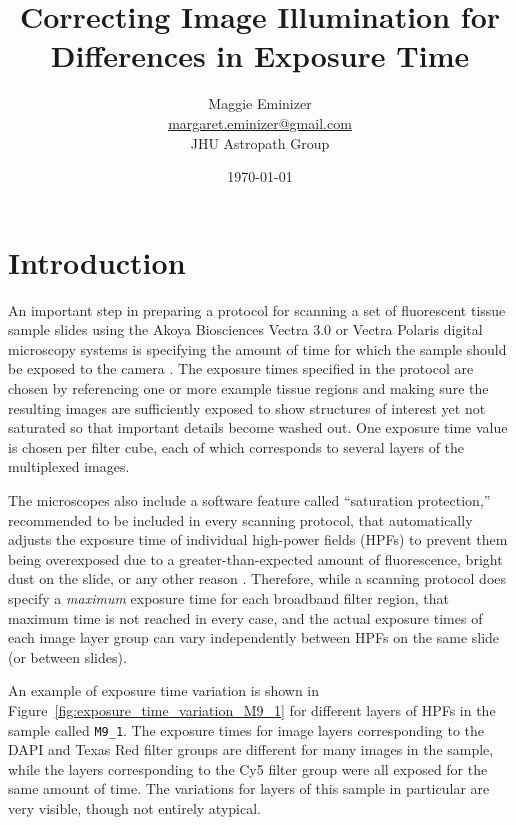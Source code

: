 \documentclass[letterpaper,11pt]{article}
\title{Correcting Image Illumination for Differences in Exposure Time}
\author{Maggie Eminizer\\ \url{margaret.eminizer@gmail.com}\\ JHU Astropath Group}
\date{\today}
\newcommand{\reffig}[1]{Figure~\ref{#1}}
\begin{document}
\maketitle

\linenumbers

\abstract{}

\section{Introduction}
\label{sec:introduction}

An important step in preparing a protocol for scanning a set of fluorescent tissue sample slides using the Akoya Biosciences Vectra 3.0 or Vectra Polaris digital microscopy systems is specifying the amount of time for which the sample should be exposed to the camera \cite{vectra_user_manual,polaris_user_manual}. The exposure times specified in the protocol are chosen by referencing one or more example tissue regions and making sure the resulting images are sufficiently exposed to show structures of interest yet not saturated so that important details become washed out. One exposure time value is chosen per filter cube, each of which corresponds to several layers of the multiplexed images.

The microscopes also include a software feature called ``saturation protection,'' recommended to be included in every scanning protocol, that automatically adjusts the exposure time of individual high-power fields (HPFs) to prevent them being overexposed due to a greater-than-expected amount of fluorescence, bright dust on the slide, or any other reason \cite{vectra_user_manual,polaris_user_manual}. Therefore, while a scanning protocol does specify a \textit{maximum} exposure time for each broadband filter region, that maximum time is not reached in every case, and the actual exposure times of each image layer group can vary independently between HPFs on the same slide (or between slides). 

An example of exposure time variation is shown in \reffig{fig:exposure_time_variation_M9_1} for different layers of HPFs in the sample called \texttt{M9\_1}. The exposure times for image layers corresponding to the DAPI and Texas Red filter groups are different for many images in the sample, while the layers corresponding to the Cy5 filter group were all exposed for the same amount of time. The variations for layers of this sample in particular are very visible, though not entirely atypical.
\end{document}
